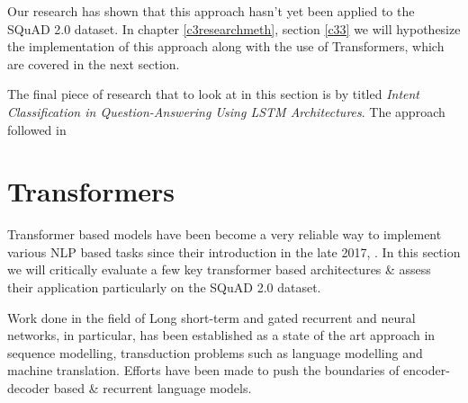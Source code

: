 \documentclass[a4paper,12pt]{report}
\begin{document}
	     Our research has shown that this approach hasn't yet been applied to the SQuAD 2.0 dataset. In chapter \ref{c3researchmeth}, section \ref{c33} we will hypothesize the implementation of this approach along with the use of Transformers, which are covered in the next section.

         The final piece of research that to look at in this section is by \cite{lstmintent} titled \textit{Intent Classification in Question-Answering Using LSTM Architectures}. The approach followed in


	    \section{Transformers}\label{23}

	        Transformer based models have been become a very reliable way to implement various NLP based tasks since their introduction in the late 2017, \citep{atayl}. In this section we will critically evaluate a few key transformer based architectures \& assess their application particularly on the SQuAD 2.0 dataset.

	        Work done in the field of Long short-term and gated recurrent \citep{lstmoriginal} and \citep{recurrent} neural networks, in particular, has been established as a state of the art approach in sequence modelling, transduction problems such as language modelling and machine translation.  Efforts have been made to push the boundaries of encoder-decoder based \& recurrent language models.
\end{document}
